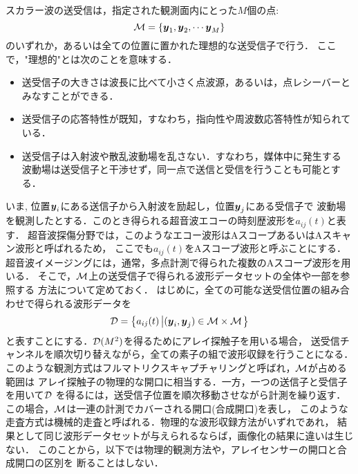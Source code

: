 スカラー波の送受信は，指定された観測面内にとった$M$個の点:
\begin{equation}
	{\cal M} =\left\{ 
		\mbox{\boldmath $y$}_1, \mbox{\boldmath $y$}_2, \cdots \mbox{\boldmath $y$}_M
	\right\}
	\label{eqn:XXX_00}
\end{equation}
のいずれか，あるいは全ての位置に置かれた理想的な送受信子で行う．
ここで，"理想的"とは次のことを意味する．
\begin{itemize}
\item
送受信子の大きさは波長に比べて小さく点波源，あるいは，点レシーバーとみなすことができる．
\item
送受信子の応答特性が既知，すなわち，指向性や周波数応答特性が知られている．
\item
送受信子は入射波や散乱波動場を乱さない．すなわち，媒体中に発生する
波動場は送受信子と干渉せず，同一点で送信と受信を行うことも可能とする．
\end{itemize}
いま, 位置$\mbox{\boldmath $y$}_i$にある送信子から入射波を励起し，位置$\mbox{\boldmath $y$}_j$にある受信子で
波動場を観測したとする．このとき得られる超音波エコーの時刻歴波形を$a_{ij}(t)$と表す．
超音波探傷分野では，このようなエコー波形はAスコープあるいはAスキャン波形と呼ばれるため，
ここでも$a_{ij}(t)$をAスコープ波形と呼ぶことにする．
超音波イメージングには，通常，多点計測で得られた複数のAスコープ波形を用いる．
そこで，$\cal M$上の送受信子で得られる波形データセットの全体や一部を参照する
方法について定めておく．
はじめに，全ての可能な送受信位置の組み合わせで得られる波形データを
\begin{equation}
	{\cal D} = \left\{ a_{ij}(t) \left| (\mbox{\boldmath $y$}_i,\mbox{\boldmath $y$}_j)  \in {\cal M}\times {\cal M} \right.\right\}
	\label{eqn:XXX_full_mat}
\end{equation}
と表すことにする．${\cal D}(M^2)$を得るためにアレイ探触子を用いる場合，
送受信チャンネルを順次切り替えながら，全ての素子の組で波形収録を行うことになる．
このような観測方式はフルマトリクスキャプチャリングと呼ばれ，$\cal M$が占める範囲は
アレイ探触子の物理的な開口に相当する．一方，一つの送信子と受信子を用いて${\cal D}$
を得るには，送受信子位置を順次移動させながら計測を繰り返す．
この場合，$\cal M$は一連の計測でカバーされる開口(合成開口)を表し，
このような走査方式は機械的走査と呼ばれる．物理的な波形収録方法がいずれであれ，
結果として同じ波形データセットが与えられるならば，画像化の結果に違いは生じない．
このことから，以下では物理的観測方法や，アレイセンサーの開口と合成開口の区別を
断ることはしない．

